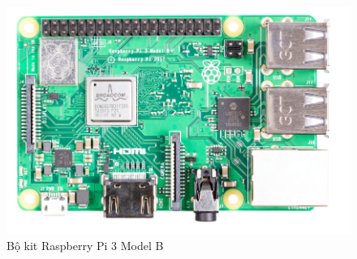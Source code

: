 \begin{figure}[H]
    \centering
    \includegraphics[width=0.75\linewidth]{../images/rpi3.png}
    \caption{Bộ kit Raspberry Pi 3 Model B}
\end{figure}